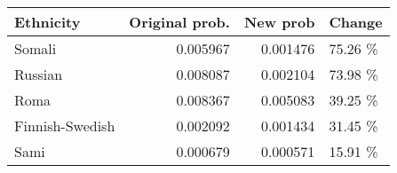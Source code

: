 \begin{tabular}{lrrl}
\toprule
      Ethnicity &  Original prob. &  New prob &  Change \\
\midrule
         Somali &        0.005967 &  0.001476 & 75.26 \% \\
        Russian &        0.008087 &  0.002104 & 73.98 \% \\
           Roma &        0.008367 &  0.005083 & 39.25 \% \\
Finnish-Swedish &        0.002092 &  0.001434 & 31.45 \% \\
           Sami &        0.000679 &  0.000571 & 15.91 \% \\
\bottomrule
\end{tabular}
